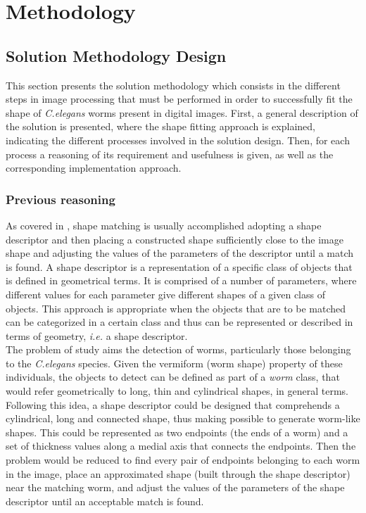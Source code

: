 \thispagestyle{empty}
\cleardoublepage  
\chapter{Methodology}
\label{chap:methodology}

\section{Solution Methodology Design}
\label{sec:solmet}

This section presents the solution methodology which consists in the different
steps in image processing that must be performed in order to successfully fit the shape of 
\emph{C.elegans} worms present in digital images. First, a general description
of the solution is presented, where the shape fitting approach is explained, indicating
the different processes involved in the solution design. Then, for each process 
a reasoning of its requirement and usefulness is given, as well as 
the corresponding implementation approach.

\subsection{Previous reasoning}
\label{sec:reasoning}

As covered in
\cite{binaryshape,deformable,matching2,matchingbook}, shape 
matching is usually accomplished adopting a shape
descriptor and then placing a constructed shape sufficiently 
close to the image shape and adjusting the values of 
the parameters of the descriptor until a match is found.
A shape descriptor is a representation of a 
specific class of objects that is defined in geometrical
terms. It is comprised of a number of parameters, where 
different values for each parameter give different 
shapes of a given class of objects.
This approach is appropriate when the objects
that are to be matched can be categorized in a certain 
class and thus can be represented or described in terms
of geometry, \emph{i.e.} a shape descriptor.\\

The problem of study aims the detection of worms,
particularly those belonging to the \emph{C.elegans} species. Given
the vermiform (worm shape) property of these individuals,
the objects to detect can be defined as part of a 
\emph{worm} class,
that would refer geometrically to long, thin and cylindrical 
shapes, in 
general terms. Following this idea, a shape descriptor could be
designed that comprehends a cylindrical, long and connected
shape, thus making possible to generate worm-like shapes. 
This could be represented as two endpoints (the ends of a worm) and a 
set of thickness values along a medial axis that connects the
endpoints.
Then the problem would be reduced to find every pair of
endpoints belonging to each worm in the image, place an approximated
shape (built through the shape descriptor) near the matching worm,
and adjust the values of the parameters of the shape descriptor until
an acceptable match is found.\\

